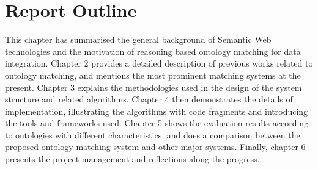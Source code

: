 \section{Report Outline}

This chapter has summarised the general background of Semantic Web technologies and the motivation of reasoning based ontology matching for data integration. Chapter 2 provides a detailed description of previous works related to ontology matching, and mentions the most prominent matching systems at the present. Chapter 3 explains the methodologies used in the design of the system structure and related algorithms. Chapter 4 then demonstrates the details of implementation, illustrating the algorithms with code fragments and introducing the tools and frameworks used. Chapter 5 shows the evaluation results according to ontologies with different characteristics, and does a comparison between the proposed ontology matching system and other major systems. Finally, chapter 6 presents the project management and reflections along the progress.
